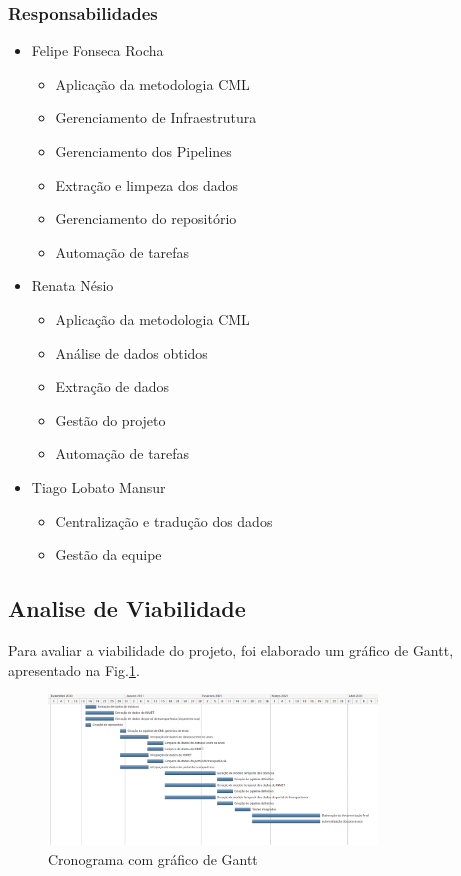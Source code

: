 \documentclass[journal]{IEEEtran}
\begin{document}
\subsubsection{Responsabilidades}
\begin{itemize}
   \item Felipe Fonseca Rocha
   \begin{itemize}
     \item Aplicação da metodologia CML
     \item Gerenciamento de Infraestrutura
     \item Gerenciamento dos Pipelines
     \item Extração e limpeza dos dados
     \item Gerenciamento do repositório
     \item Automação de tarefas 
   \end{itemize}
   
    \item Renata Nésio
   \begin{itemize}
     \item Aplicação da metodologia CML
    \item Análise de dados obtidos
     \item Extração de dados
     \item Gestão do projeto
     \item Automação de tarefas 

   \end{itemize}
   
   \item Tiago Lobato Mansur
   \begin{itemize}
     \item Centralização e tradução dos dados
     \item Gestão da equipe
   \end{itemize}
\end{itemize}
\subsection{Analise de Viabilidade}

Para avaliar a viabilidade do projeto, foi elaborado um gráfico de Gantt, apresentado na Fig.\ref{fig:Gantt}.

\begin{figure}[htpb]
    \centering
    \includegraphics[height=4cm,keepaspectratio=true]{docs/Cronograma.PNG}
    \caption{Cronograma com gráfico de Gantt}
    \label{fig:Gantt}
    \centering
\end{figure}
\end{document}
